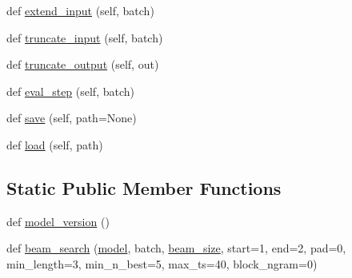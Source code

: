 \begin{DoxyCompactItemize}
\item 
def \hyperlink{classparlai_1_1agents_1_1legacy__agents_1_1seq2seq_1_1seq2seq__v1_1_1Seq2seqAgent_aa1e972eb8a41c98486a50baa14700345}{extend\+\_\+input} (self, batch)
\item 
def \hyperlink{classparlai_1_1agents_1_1legacy__agents_1_1seq2seq_1_1seq2seq__v1_1_1Seq2seqAgent_ae4496420685c3cd273920f89b4e82625}{truncate\+\_\+input} (self, batch)
\item 
def \hyperlink{classparlai_1_1agents_1_1legacy__agents_1_1seq2seq_1_1seq2seq__v1_1_1Seq2seqAgent_a4567d7a200e20bd09235d4833424bdad}{truncate\+\_\+output} (self, out)
\item 
def \hyperlink{classparlai_1_1agents_1_1legacy__agents_1_1seq2seq_1_1seq2seq__v1_1_1Seq2seqAgent_ad06de7c94ee40c403f792e7b48e0b137}{eval\+\_\+step} (self, batch)
\item 
def \hyperlink{classparlai_1_1agents_1_1legacy__agents_1_1seq2seq_1_1seq2seq__v1_1_1Seq2seqAgent_a8aa6a1efae9091dc0b38af3ce4b49706}{save} (self, path=None)
\item 
def \hyperlink{classparlai_1_1agents_1_1legacy__agents_1_1seq2seq_1_1seq2seq__v1_1_1Seq2seqAgent_a3ee5ae38c0e37bcc1e4eb44bae8a3cce}{load} (self, path)
\end{DoxyCompactItemize}
\subsection*{Static Public Member Functions}
\begin{DoxyCompactItemize}
\item 
def \hyperlink{classparlai_1_1agents_1_1legacy__agents_1_1seq2seq_1_1seq2seq__v1_1_1Seq2seqAgent_a3838eb2d88b4e9f80c9c234e6742fa30}{model\+\_\+version} ()
\item 
def \hyperlink{classparlai_1_1agents_1_1legacy__agents_1_1seq2seq_1_1seq2seq__v1_1_1Seq2seqAgent_a58227903fd44e3d436710c06457c8f84}{beam\+\_\+search} (\hyperlink{classparlai_1_1agents_1_1legacy__agents_1_1seq2seq_1_1seq2seq__v1_1_1Seq2seqAgent_aeea96acec40c7a63d019ca56feca3c73}{model}, batch, \hyperlink{classparlai_1_1agents_1_1legacy__agents_1_1seq2seq_1_1seq2seq__v1_1_1Seq2seqAgent_ab4afd6e6f79d32bd21e60ac11c0d414b}{beam\+\_\+size}, start=1, end=2, pad=0, min\+\_\+length=3, min\+\_\+n\+\_\+best=5, max\+\_\+ts=40, block\+\_\+ngram=0)
\end{DoxyCompactItemize}
